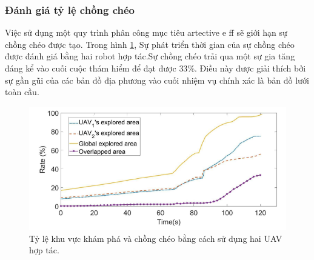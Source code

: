 \documentclass[11pt,openany]{book}
\begin{document}
\begin{algorimth}[H]
\subsubsection{Đánh giá tỷ lệ chồng chéo}
Việc sử dụng một quy trình phân công mục tiêu artective e ff sẽ giới hạn sự chồng chéo được tạo. Trong hình \ref{fig:3.19}, Sự phát triển thời gian của sự chồng chéo được đánh giá bằng hai robot hợp tác.Sự chồng chéo trải qua một sự gia tăng đáng kể vào cuối cuộc thám hiểm để đạt được $33\%$. Điều này được giải thích bởi sự gần gũi của các bản đồ địa phương vào cuối nhiệm vụ chính xác là bản đồ lưới toàn cầu.
\begin{figure}[H]
    \centering
    \includegraphics[tỉ lệ=0.4]{assets/3_19.png}
    \caption{Tỷ lệ khu vực khám phá và chồng chéo bằng cách sử dụng hai UAV hợp tác.}
    \label{fig:3.19}
\end{figure}

\end{algorimth}
\end{document}
